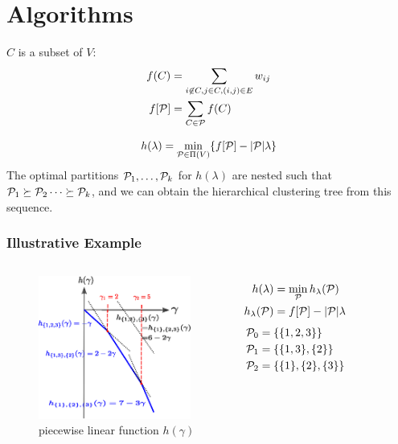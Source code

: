 \documentclass{beamer}
\begin{document}
\section{Algorithms}
\begin{frame}
\begin{definition}
$C$ is a subset of $V$:
\begin{align}
f(C) & = \sum_{i\not\in C, j \in C, (i,j) \in E} w_{ij} \\
f[\P] & = \sum_{C \in \P} f(C)
\end{align}
\end{definition}
\begin{theorem}
\begin{equation}\label{eq:hLambda}
h(\lambda) = \min_{\P \in \Pi(V)} \{ f[\P] - \abs{\P}\lambda \}
\end{equation}
The optimal partitions $\P_1, \dots, \P_k$ for $h(\lambda)$ are nested such that $\P_1 \succeq \P_2 \dots \succeq \P_k$, and we can obtain the hierarchical clustering tree from this sequence.
\end{theorem}
\end{frame}
\begin{frame}
\frametitle{Illustrative Example}
\begin{columns}
\column{5cm}
\begin{figure}
\includegraphics[width=5cm]{pic/dt.eps}
\caption{piecewise linear function $h(\gamma)$}
\end{figure}
\column{5cm}
\begin{align*}
h(\lambda)  & = \min_{\P} h_{\lambda}(\P) \\
h_{\lambda}(\P) & = f[\P] - \abs{\P}\lambda
\end{align*}
\begin{align*}
\P_0  & = \{\{1,2,3\}\} \\
\P_1  & = \{\{1,3\},\{2\}\} \\
\P_2  & = \{\{1\},\{2\},\{3\}\} 
\end{align*}

\end{columns}
\end{frame}
\end{document}
